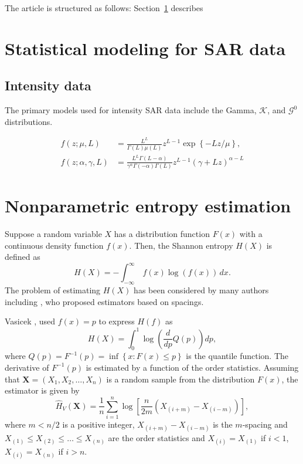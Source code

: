 \documentclass[conference]{IEEEtran}
\begin{document}
The article is structured as follows: 
Section~\ref{sec_02} describes 

\section{Statistical modeling for SAR data}\label{sec_02}

\subsection{Intensity data}

The primary models used for intensity SAR data include the Gamma, $\mathcal{K}$, and $\mathcal{G}^0$ distributions. 


\begin{align}
	f(z; \mu, L)&=\frac{L^L}{\Gamma(L)\mu(L)}z^{L-1}\exp\left\{-Lz/\mu\right\},\\
	f(z; \alpha, \gamma, L)&=\frac{L^L\Gamma(L-\alpha)}{\gamma^{\alpha}\Gamma(-\alpha)\Gamma(L)}z^{L-1}(\gamma+Lz)^{\alpha-L}
\end{align}


\section{Nonparametric entropy estimation}



Suppose a random variable $X$ has a distribution function $F(x)$ with a continuous density function $f(x)$. Then, the Shannon entropy $H(X)$ is defined as
\begin{equation*}
  H(X)=-\int_{-\infty }^\infty \ f(x)\log(f(x))\,dx.
\end{equation*}
The problem of estimating $H(X)$ has been considered by many authors including \cite{vasicek1976test, Bert1992, Wieczorkowski1999, correa1995new}, who proposed estimators based on spacings.

Vasicek \cite{vasicek1976test}, used $f(x)=p$  to express $ H(f)$ as
\begin{equation*}
	H(X)= \int_0^1 \log\left(\frac{d}{dp}Q(p)\right)dp,
\end{equation*}
where $Q(p)=F^{-1}(p)=\inf\left\{x: F(x)\leq p\right\}$ is the quantile function. The derivative of $F^{-1}(p)$ is  estimated by a function of the order statistics.
Assuming that  $\bm{X}=(X_1, X_2, \ldots,X_n)$ is a random sample from the distribution $F(x)$, the estimator is given by
\begin{equation*}
	\widehat{H}_{V}(\bm{X})=\frac{1}{n}\sum_{i=1}^{n}\log\left[\frac{n}{2m}\left(X_{(i+m)}-X_{(i-m)}\right)\right],
	\end{equation*}
where $m<n/2$ is a positive integer, $X_{(i+m)}-X_{(i-m)}$ is the $m$-spacing and $X_{(1)}\leq X_{(2)}\leq\ldots\leq X_{(n)}$ are the order statistics and $X_{(i)}= X_{(1)}$ if $i<1$, $X_{(i)}= X_{(n)}$ if $i>n$.
\end{document}
